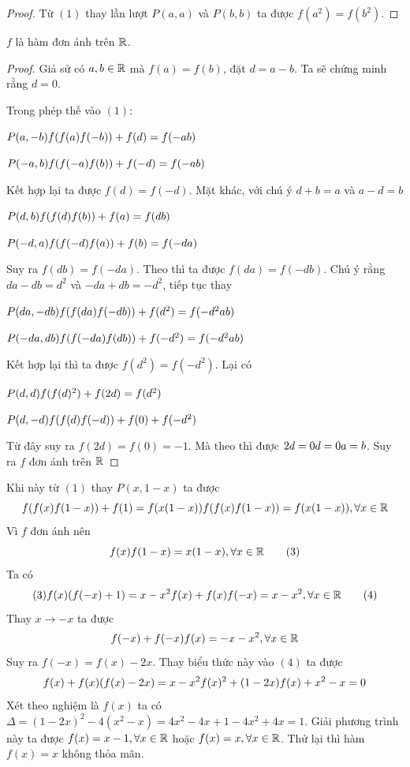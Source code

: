 \documentclass[11pt]{scrartcl}
\begin{document}
\begin{itemize}[label=, leftmargin=0em, itemsep=0.5em]
\begin{sol}
\begin{proof}
            Từ $(1)$ thay lần lượt $P(a,a)$ và $P(b,b)$ ta được $f(a^2) = f(b^2)$.
          \end{proof}
          $f$ là hàm đơn ánh trên $\mathbb{R}$.
          \begin{proof}
            Giả sử có $a,b \in \mathbb{R}$ mà $f(a) = f(b)$, đặt $d = a - b$. Ta sẽ chứng minh rằng $d = 0$. 
            
            Trong phép thế vào $(1)$:
    
            $P(a,-b) \ra f(f(a)f(-b)) + f(d) = f(-ab)$ 
    
            $P(-a,b) \ra f(f(-a)f(b)) + f(-d) = f(-ab)$ 
    
            Kết hợp lại ta được $f(d) = f(-d)$. 
            Mặt khác, với chú ý $d + b = a$ và $a - d = b$
    
            $P(d,b) \ra f(f(d)f(b)) + f(a) = f(db)$
    
            $P(-d,a) \ra f(f(-d)f(a)) + f(b) = f(-da)$
    
            Suy ra $f(db) = f(-da)$. Theo  thì ta được $f(da) = f(-db)$. Chú ý rằng $da - db = d^2$ và $ -da + db = -d^2$, tiếp tục thay
    
            $P(da,-db) \ra f(f(da)f(-db)) + f(d^2) = f(-d^2ab)$
    
            $P(-da,db) \ra f(f(-da)f(db)) + f(-d^2) = f(-d^2ab)$
            
            Kết hợp lại thì ta được $f(d^2) = f(-d^2)$. Lại có 
            
            $P(d,d) \ra f(f(d)^2) + f(2d) = f(d^2)$ 
    
            $P(d,-d) \ra f(f(d)f(-d)) + f(0) + f(-d^2)$
    
            Từ đây suy ra $f(2d) = f(0) = - 1$. Mà theo  thì được $2d = 0 \lra d = 0 \lra a = b$. Suy ra $f$ đơn ánh trên $\mathbb{R}$
          \end{proof}
    
          Khi này từ $(1)$ thay $P(x,1-x)$ ta được
          \[
          f(f(x)f(1-x)) + f(1) = f(x(1-x)) \lra f(f(x)f(1 - x)) = f(x(1-x)),\xr
          \]
          Vì $f$ đơn ánh nên \[f(x)f(1-x) = x(1-x),\forall x\in \mathbb{R} \tag{3}\]
          Ta có 
          \[
            (3) \lra f(x)(f(-x) + 1) = x - x^2 \lra f(x) + f(x)f(-x) = x - x^2, \xr\tag{4}
          \]
          Thay $x \to -x$ ta được
          \[
            f(-x) + f(-x)f(x) = -x - x^2, \forall x\in \mathbb{R}
          \]
          Suy ra $f(-x) = f(x) - 2x$. Thay biểu thức này vào $(4)$ ta được
          \[
            f(x) + f(x)(f(x) - 2x) = x - x^2 \lra f(x)^2 + (1 - 2x)f(x) +x^2 - x = 0
          \]
          Xét theo nghiệm là $f(x)$ ta có $\Delta  = (1 - 2x)^2 - 4(x^2 - x) = 4x^2 - 4x + 1 - 4x^2 + 4x = 1$. Giải phương trình này ta được $f(x) = x - 1,\forall x\in \mathbb{R}$ hoặc $f(x) = x,\forall x\in \mathbb{R}$.
          Thử lại thì hàm $f(x) = x$ không thỏa mãn.
          

\end{sol}
\end{itemize}
\end{document}
